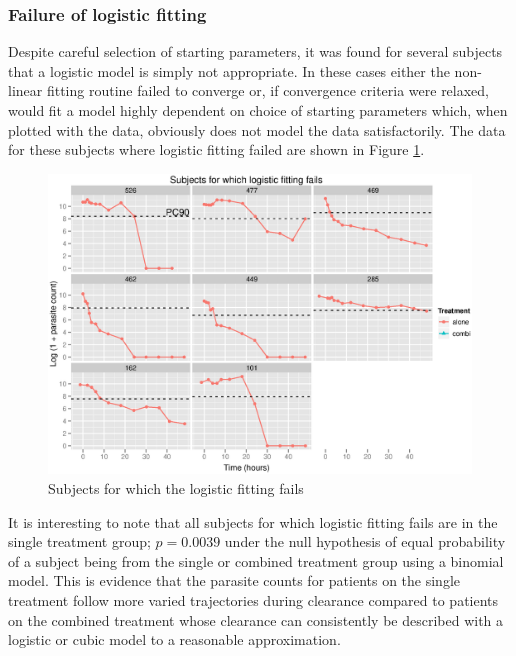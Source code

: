 \subsubsection*{Failure of logistic fitting}
Despite careful selection of starting parameters, it was found for several subjects that a logistic model is simply not appropriate. In these cases either the non-linear fitting routine failed to converge or, if convergence criteria were relaxed, would fit a model highly dependent on choice of starting parameters which, when plotted with the data, obviously does not model the data satisfactorily. The data for these subjects where logistic fitting failed are shown in Figure \ref{failures}.
\begin{figure}[h]
\includegraphics[width=6.1in]{failures.eps} 
\caption{Subjects for which the logistic fitting fails}\label{failures}
\end{figure}

It is interesting to note that all subjects for which logistic fitting fails are in the single treatment group; $p=0.0039$ under the null hypothesis of equal probability of a subject being from the single or combined treatment group using a binomial model. This is evidence that the parasite counts for patients on the single treatment follow more varied trajectories during clearance compared to patients on the combined treatment whose clearance can consistently be described with a logistic or cubic model to a reasonable approximation.

